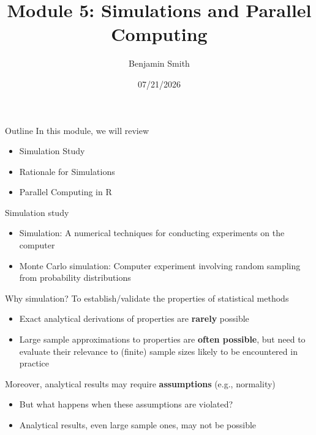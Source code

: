 \documentclass[
  ignorenonframetext,
]{beamer}
\title{\texorpdfstring{Module 5: Simulations and Parallel
Computing}{Module 5: Simulations and Parallel Computing}}
\author{\texorpdfstring{Benjamin Smith}{Benjamin Smith}}
\date{07/21/2026}
\providecommand{\tightlist}{%
  \setlength{\itemsep}{0pt}\setlength{\parskip}{0pt}}
\begin{document}
\frame{\titlepage}

\begin{frame}{Outline}
\protect{}\label{outline}
In this module, we will review

\begin{itemize}
\tightlist
\item
  Simulation Study
\item
  Rationale for Simulations
\item
  Parallel Computing in R
\end{itemize}
\end{frame}

\begin{frame}{Simulation study}
\protect{}\label{simulation-study}
\begin{itemize}
\item
  Simulation: A numerical techniques for conducting experiments on the
  computer
\item
  Monte Carlo simulation: Computer experiment involving random sampling
  from probability distributions
\end{itemize}
\end{frame}

\begin{frame}{Why simulation?}
\protect{}\label{why-simulation}
To establish/validate the properties of statistical methods

\begin{itemize}
\tightlist
\item
  Exact analytical derivations of properties are \textbf{rarely}
  possible
\item
  Large sample approximations to properties are \textbf{often possible},
  but need to evaluate their relevance to (finite) sample sizes likely
  to be encountered in practice
\end{itemize}

\pause

Moreover, analytical results may require \textbf{assumptions} (e.g.,
normality)

\begin{itemize}
\tightlist
\item
  But what happens when these assumptions are violated?
\item
  Analytical results, even large sample ones, may not be possible
\end{itemize}
\end{frame}
\end{document}
